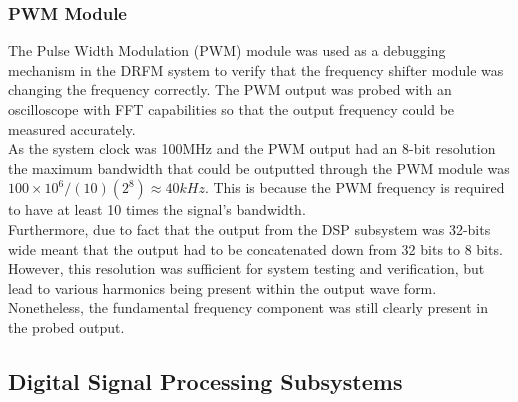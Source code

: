 		\subsubsection{PWM Module}
		The Pulse Width Modulation (PWM) module was used as a debugging mechanism in the DRFM system to verify that the frequency shifter module was changing the frequency correctly. The PWM output was probed with an oscilloscope with FFT capabilities so that the output frequency could be measured accurately. \\ \newline As the system clock was 100MHz and the PWM output had an 8-bit resolution the maximum bandwidth that could be outputted through the PWM module was $100\times10^6 / (10)(2^8) \approx 40kHz$. This is because the PWM frequency is required to have at least 10 times the signal's bandwidth.\\ \newline Furthermore, due to fact that the output from the DSP subsystem was 32-bits wide meant that the output had to be concatenated down from 32 bits to 8 bits. However, this resolution was sufficient for system testing and verification, but lead to various harmonics being present within the output wave form. Nonetheless, the fundamental frequency component was still clearly present in the probed output. 	


	
	\subsection{Digital Signal Processing Subsystems}
